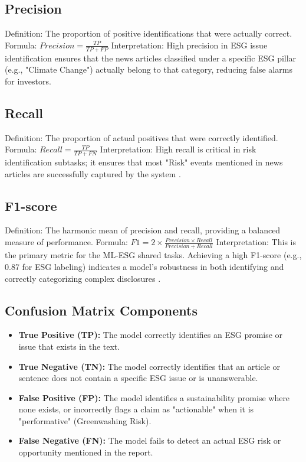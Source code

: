 \documentclass{article}
\begin{document}
\subsection{Precision}
Definition: The proportion of positive identifications that were actually correct.
Formula: $Precision = \frac{TP}{TP + FP}$
Interpretation: High precision in ESG issue identification ensures that the news articles classified under a specific ESG pillar (e.g., "Climate Change") actually belong to that category, reducing false alarms for investors.

\subsection{Recall}
Definition: The proportion of actual positives that were correctly identified.
Formula: $Recall = \frac{TP}{TP + FN}$
Interpretation: High recall is critical in risk identification subtasks; it ensures that most "Risk" events mentioned in news articles are successfully captured by the system \citep{ESG Impact Type Classification: Leveraging Strategic Prompt Engineering and LLM Fine-Tuning}.

\subsection{F1-score}
Definition: The harmonic mean of precision and recall, providing a balanced measure of performance.
Formula: $F1 = 2 \times \frac{Precision \times Recall}{Precision + Recall}$
Interpretation: This is the primary metric for the ML-ESG shared tasks. Achieving a high F1-score (e.g., 0.87 for ESG labeling) indicates a model's robustness in both identifying and correctly categorizing complex disclosures \citep{Textual Evidence Extraction for ESG Scores, EaSyGuide : ESG Issue Identification Framework leveraging Abilities of Generative Large Language Models}.

\subsection{Confusion Matrix Components}
\begin{itemize}
\item \textbf{True Positive (TP):} The model correctly identifies an ESG promise or issue that exists in the text.
\item \textbf{True Negative (TN):} The model correctly identifies that an article or sentence does not contain a specific ESG issue or is unanswerable.
\item \textbf{False Positive (FP):} The model identifies a sustainability promise where none exists, or incorrectly flags a claim as "actionable" when it is "performative" (Greenwashing Risk).
\item \textbf{False Negative (FN):} The model fails to detect an actual ESG risk or opportunity mentioned in the report.
\end{itemize}
\end{document}
